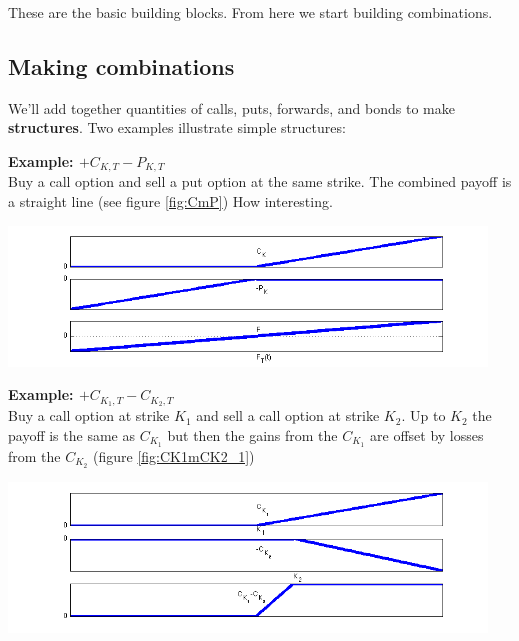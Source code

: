 These are the basic building blocks. From here we start building combinations.

\subsection{Making combinations}

We'll add together quantities of calls, puts, forwards, and bonds to make \textbf{structures}. Two examples illustrate simple structures:

\textbf{Example: $+C_{K,T}-P_{K,T}$}\\
Buy a call option and sell a put option at the same strike. The combined payoff is a straight line (see figure \ref{fig:CmP}) How interesting. 
 
 \begin{center}
\includegraphics[width=5in]{pics/CmP}%
\label{fig:CmP}%
\end{center}
 
 
 \textbf{Example: $+C_{K_1,T}-C_{K_2,T}$}\\
Buy a call option at strike $K_1$ and sell a call option at strike $K_2$. Up to $K_2$ the payoff is the same as $C_{K_1}$ but then the gains from the $C_{K_1}$ are offset by losses from the $C_{K_2}$ (figure \ref{fig:CK1mCK2_1})
 
  \begin{center}
\includegraphics[width=5in]{pics/CK1mCK2}%
\label{fig:CK1mCK2_1}%
\end{center}
 
